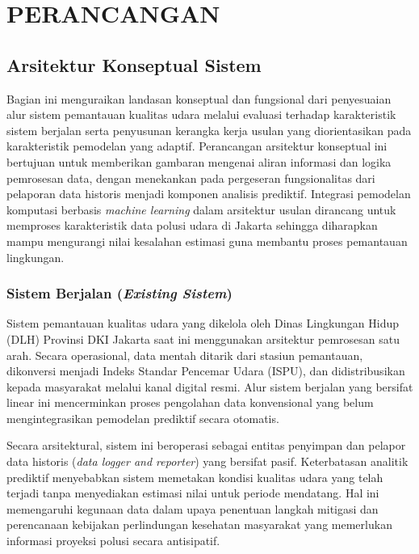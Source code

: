 \cleardoublepage
\chapter{PERANCANGAN}
\label{chap:perancangan}

\section{Arsitektur Konseptual Sistem}

Bagian ini menguraikan landasan konseptual dan fungsional dari penyesuaian alur sistem pemantauan kualitas udara melalui evaluasi terhadap karakteristik sistem berjalan serta penyusunan kerangka kerja usulan yang diorientasikan pada karakteristik pemodelan yang adaptif. Perancangan arsitektur konseptual ini bertujuan untuk memberikan gambaran mengenai aliran informasi dan logika pemrosesan data, dengan menekankan pada pergeseran fungsionalitas dari pelaporan data historis menjadi komponen analisis prediktif. Integrasi pemodelan komputasi berbasis \textit{machine learning} dalam arsitektur usulan dirancang untuk memproses karakteristik data polusi udara di Jakarta sehingga diharapkan mampu mengurangi nilai kesalahan estimasi guna membantu proses pemantauan lingkungan.

\subsection{Sistem Berjalan (\textit{Existing Sistem})}

Sistem pemantauan kualitas udara yang dikelola oleh Dinas Lingkungan Hidup (DLH) Provinsi DKI Jakarta saat ini menggunakan arsitektur pemrosesan satu arah. Secara operasional, data mentah ditarik dari stasiun pemantauan, dikonversi menjadi Indeks Standar Pencemar Udara (ISPU), dan didistribusikan kepada masyarakat melalui kanal digital resmi. Alur sistem berjalan yang bersifat linear ini mencerminkan proses pengolahan data konvensional yang belum mengintegrasikan pemodelan prediktif secara otomatis.

Secara arsitektural, sistem ini beroperasi sebagai entitas penyimpan dan pelapor data historis (\textit{data logger and reporter}) yang bersifat pasif. Keterbatasan analitik prediktif menyebabkan sistem memetakan kondisi kualitas udara yang telah terjadi tanpa menyediakan estimasi nilai untuk periode mendatang. Hal ini memengaruhi kegunaan data dalam upaya penentuan langkah mitigasi dan perencanaan kebijakan perlindungan kesehatan masyarakat yang memerlukan informasi proyeksi polusi secara antisipatif.

